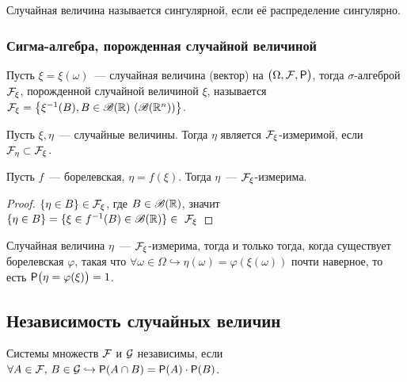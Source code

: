 \begin{definition}
    Случайная величина называется сингулярной, если её распределение сингулярно.
\end{definition}

\subsubsection*{ Сигма-алгебра, порожденная случайной величиной}
\begin{definition}
	Пусть $\xi = \xi(\omega)$~--- случайная величина (вектор) на $\big(\Omega, \F, \P\big)$, тогда $\sigma$-алгеброй $\F_\xi$, порожденной случайной величиной $\xi$, называется $\F_\xi = \big\{\xi^{-1}(B), B \in \B(\R)\ (\B(\R^n)) \big\}$.
\end{definition}

\setcounter{property}{0}

\begin{definition}
	Пусть $\xi, \eta$~--- случайные величины. Тогда $\eta$ является $\F_\xi$-измеримой, если $\F_\eta \subset \F_\xi$.
\end{definition}

\begin{example}
	Пусть $f$~--- борелевская, $\eta = f(\xi)$. Тогда $\eta$~--- $\F_\xi$-измерима.
	\begin{proof}
		$\{\eta \in B\} \in \F_\xi$, где $B \in \B(\R)$, значит $\{\eta \in B\} = \{\xi \in f^{-1}(B) \in \B(\R)\} \in~\F_\xi$
	\end{proof}
\end{example}

\begin{theorem}[][б/д]
	Случайная величина $\eta$~--- $\F_\xi$-измерима, тогда и только тогда, когда существует борелевская $\varphi$, такая что $\forall \omega \in \Omega \hookrightarrow \eta(\omega) = \varphi(\xi(\omega))$ почти наверное, то есть $\P\big(\eta = \varphi(\xi)\big) = 1$.
\end{theorem}

\subsection{Независимость случайных величин}

\begin{definition}
	Системы множеств $\F$ и $\G$ независимы, если $\forall A \in \F,\, B \in \G \hookrightarrow \P(A \cap B) = \P(A)\cdot\P(B)$.
\end{definition}

